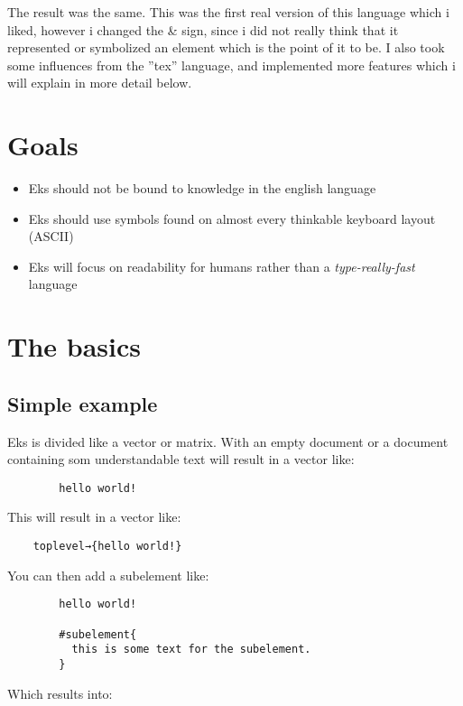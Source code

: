 \documentclass{book}
\begin{document}
	The result was the same. This was the first real version of this language which i liked, however i changed the \& sign, since i did not really think that it represented or symbolized an element which is the point of it to be.
	I also took some influences from the ''tex'' language, and implemented more features which i will explain in more detail below.
	
	\chapter{Goals}
	
	\begin{itemize}
		\item Eks should not be bound to knowledge in the english language
		\item Eks should use symbols found on almost every thinkable keyboard layout (ASCII)
		\item Eks will focus on readability for humans rather than a \emph{type-really-fast} language
	\end{itemize}
	
	\chapter{The basics}
	
	\section{Simple example}
	
	Eks is divided like a vector or matrix. With an empty document or a document containing som understandable text will result in a vector like:
	
	\begin{verbatim}
		hello world!
	\end{verbatim}
	
	This will result in a vector like:
	
	\begin{verbatim}
	toplevel→{hello world!}
	\end{verbatim}
	
	You can then add a subelement like:
	
	\begin{verbatim}
		hello world!
		
		#subelement{
		  this is some text for the subelement.
		}
	\end{verbatim}
	
	Which results into:
	
\end{document}
